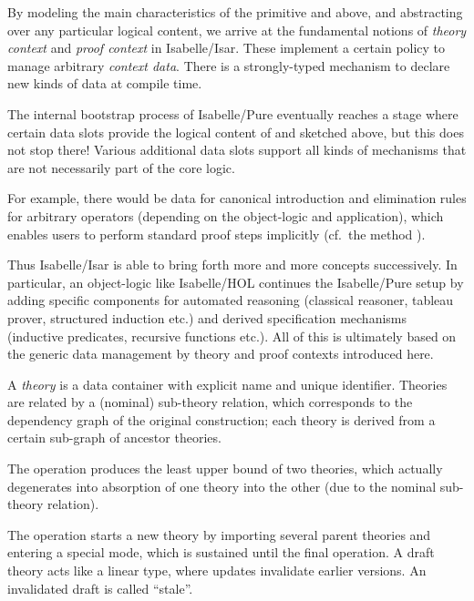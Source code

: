 \begin{isabellebody}
\begin{isamarkuptext}
\begin{itemize}
  \end{itemize}

  \medskip By modeling the main characteristics of the primitive
  \isa{{\isasymTheta}} and \isa{{\isasymGamma}} above, and abstracting over any
  particular logical content, we arrive at the fundamental notions of
  \emph{theory context} and \emph{proof context} in Isabelle/Isar.
  These implement a certain policy to manage arbitrary \emph{context
  data}.  There is a strongly-typed mechanism to declare new kinds of
  data at compile time.

  The internal bootstrap process of Isabelle/Pure eventually reaches a
  stage where certain data slots provide the logical content of \isa{{\isasymTheta}} and \isa{{\isasymGamma}} sketched above, but this does not stop there!
  Various additional data slots support all kinds of mechanisms that
  are not necessarily part of the core logic.

  For example, there would be data for canonical introduction and
  elimination rules for arbitrary operators (depending on the
  object-logic and application), which enables users to perform
  standard proof steps implicitly (cf.\ the  method
  \cite{isabelle-isar-ref}).

  \medskip Thus Isabelle/Isar is able to bring forth more and more
  concepts successively.  In particular, an object-logic like
  Isabelle/HOL continues the Isabelle/Pure setup by adding specific
  components for automated reasoning (classical reasoner, tableau
  prover, structured induction etc.) and derived specification
  mechanisms (inductive predicates, recursive functions etc.).  All of
  this is ultimately based on the generic data management by theory
  and proof contexts introduced here.%
\end{isamarkuptext}%
\isamarkuptrue%
%
\isamarkuptrue%
%
\begin{isamarkuptext}%
A \emph{theory} is a data container with explicit name and unique
  identifier.  Theories are related by a (nominal) sub-theory
  relation, which corresponds to the dependency graph of the original
  construction; each theory is derived from a certain sub-graph of
  ancestor theories.

  The  operation produces the least upper bound of two
  theories, which actually degenerates into absorption of one theory
  into the other (due to the nominal sub-theory relation).

  The  operation starts a new theory by importing
  several parent theories and entering a special  mode,
  which is sustained until the final  operation.  A draft
  theory acts like a linear type, where updates invalidate earlier
  versions.  An invalidated draft is called ``stale''.


\end{isamarkuptext}
\end{isabellebody}
